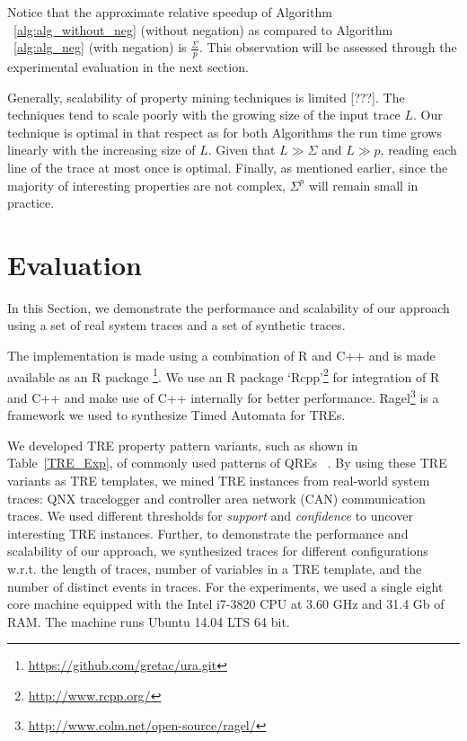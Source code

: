 \documentclass[]{sigplanconf}
\begin{document}
Notice that the approximate relative speedup of Algorithm ~\ref{alg:alg_without_neg} (without negation) as compared to Algorithm ~\ref{alg:alg_neg} (with negation) is $\frac{\Sigma}{p}$. This observation will be assessed through the experimental evaluation in the next section.


Generally, scalability of property mining techniques is limited [???].
The techniques tend to scale poorly with the growing size of the input trace $L$. Our technique is optimal in that respect as for both Algorithms the run time grows linearly with the increasing size of $L$. Given that $L \gg \Sigma$ and $L \gg p$, reading each line of the trace at most once is optimal.
Finally, as mentioned earlier, since the majority of interesting properties are not complex, $\Sigma^p$ will remain small in practice.


\section{Evaluation}

In this Section, we demonstrate the performance and scalability of our approach using a set of real system traces and a set of synthetic traces.

The implementation is made using a combination of R and C++ and is made available as an R package \footnote{\url{https://github.com/gretac/ura.git}}. We use an R package `Rcpp'\footnote{\url{http://www.rcpp.org/}} for integration of R and C++ and make use of C++ internally for better performance. Ragel\footnote{\url{http://www.colm.net/open-source/ragel/}} is a framework we used to synthesize Timed Automata for TREs.

We developed TRE property pattern variants, such as shown in Table~\ref{TRE_Exp}, of commonly used patterns of QREs ~\cite{DBLP:conf/paste/YangE04}. By using these TRE variants as TRE templates, we mined TRE instances from real-world system traces: QNX tracelogger and controller area network (CAN) communication traces. We used different thresholds for \emph{support} and \emph{confidence} to uncover interesting TRE instances. Further, to demonstrate the performance and scalability of our approach, we synthesized traces for different configurations w.r.t. the length of traces, number of variables in a TRE template, and the number of distinct events in traces. For the experiments, we used a single eight core machine equipped with the Intel i7-3820 CPU at 3.60 GHz and 31.4 Gb of RAM. The machine runs Ubuntu 14.04 LTS 64 bit.
\end{document}

